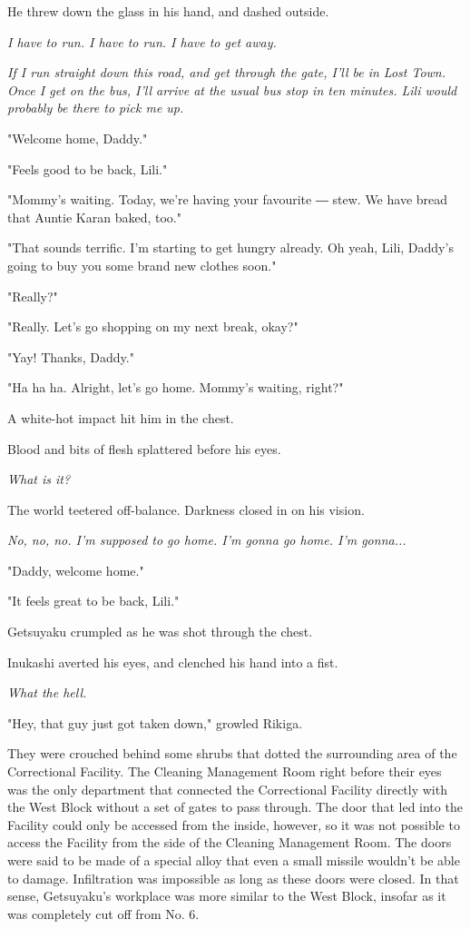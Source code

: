 He threw down the glass in his hand, and dashed outside.

\emph{I have to run. I have to run. I have to get away.}

\emph{If I run straight down this road, and get through the gate, I'll be in
Lost Town. Once I get on the bus, I'll arrive at the usual bus stop in
ten minutes. Lili would probably be there to pick me up.}

"Welcome home, Daddy."

"Feels good to be back, Lili."

"Mommy's waiting. Today, we're having your favourite ― stew. We have
bread that Auntie Karan baked, too."

"That sounds terrific. I'm starting to get hungry already. Oh yeah,
Lili, Daddy's going to buy you some brand new clothes soon."

"Really?"

"Really. Let's go shopping on my next break, okay?"

"Yay! Thanks, Daddy."

"Ha ha ha. Alright, let's go home. Mommy's waiting, right?"

A white-hot impact hit him in the chest.

Blood and bits of flesh splattered before his eyes.

\emph{What is it?}

The world teetered off-balance. Darkness closed in on his vision.

\emph{No, no, no. I'm supposed to go home. I'm gonna go home. I'm gonna...}

"Daddy, welcome home."

"It feels great to be back, Lili."

Getsuyaku crumpled as he was shot through the chest.

\myspace

Inukashi averted his eyes, and clenched his hand into a fist.

\emph{What the hell.}

"Hey, that guy just got taken down," growled Rikiga.

They were crouched behind some shrubs that dotted the surrounding area
of the Correctional Facility. The Cleaning Management Room right before
their eyes was the only department that connected the Correctional
Facility directly with the West Block without a set of gates to pass
through. The door that led into the Facility could only be accessed from
the inside, however, so it was not possible to access the Facility from
the side of the Cleaning Management Room. The doors were said to be made
of a special alloy that even a small missile wouldn't be able to damage.
Infiltration was impossible as long as these doors were closed. In that
sense, Getsuyaku's workplace was more similar to the West Block, insofar
as it was completely cut off from No. 6.

